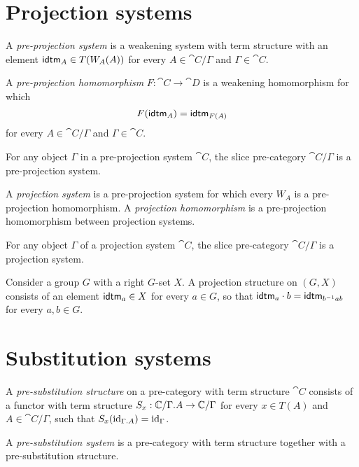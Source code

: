 \section{Projection systems}
\begin{defn}
A \emph{pre-projection system} is a weakening system with term structure with an element
$\tfid{A}\in T(W_A(A))$ for every $A\in\cat{C}/\Gamma$ and $\Gamma\in\cat{C}$. 
\end{defn}

\begin{defn}
A \emph{pre-projection homomorphism} $F:\cat{C}\to\cat{D}$ is a weakening homomorphism for which
\begin{equation*}
F(\tfid{A})=\tfid{F(A)}
\end{equation*}
for every $A\in\cat{C}/\Gamma$ and $\Gamma\in\cat{C}$.
\end{defn}

\begin{lem}
For any object $\Gamma$ in a pre-projection system $\cat{C}$, the slice pre-category
$\cat{C}/\Gamma$ is a pre-projection system.
\end{lem}

\begin{defn}
A \emph{projection system} is a pre-projection system for which every $W_A$ is
a pre-projection homomorphism. A \emph{projection homomorphism} is a pre-projection homomorphism
between projection systems.
\end{defn}

\begin{cor}
For any object $\Gamma$ of a projection system $\cat{C}$, the slice pre-category $\cat{C}/\Gamma$
is a projection system.
\end{cor}

\begin{eg}
Consider a group $G$ with a right $G$-set $X$. A projection structure on $(G,X)$
consists of an element $\tfid{a}\in X$ for every $a\in G$, so that $\tfid{a}\cdot b=
\tfid{b^{-1}ab}$ for every $a,b\in G$. 

\end{eg}

\section{Substitution systems}

\begin{defn}
A \emph{pre-substitution structure} on a pre-category with term structure $\cat{C}$ consists
of a functor with term structure $S_x:\cat{C}/\ctxext{\Gamma}{A}\to\cat{C}/\Gamma$ for every $x\in T(A)$ and
$A\in\cat{C}/\Gamma$, such that $S_x(\catid{\ctxext{\Gamma}{A}})=\catid{\Gamma}$.

A \emph{pre-substitution system} is a pre-category with term structure together with a
pre-substitution structure. 
\end{defn}

